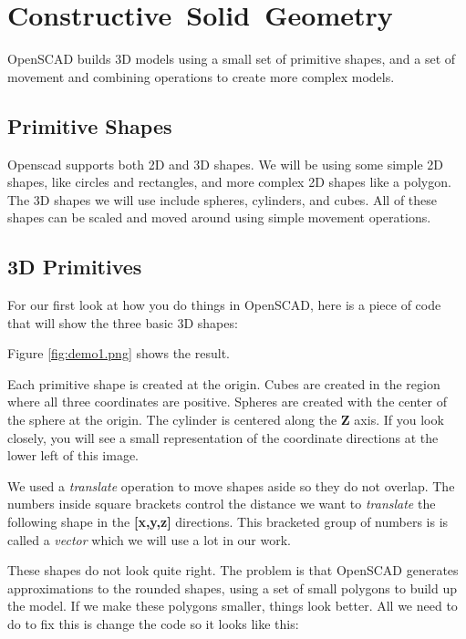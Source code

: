 \section*{\mbox{Constructive Solid Geometry}}

OpenSCAD builds 3D models using a small set of primitive shapes, and a set of
movement and combining operations to create more complex models.

\subsection*{Primitive Shapes}

Openscad supports both 2D and 3D shapes. We will be using some simple 2D
shapes, like circles and rectangles, and more complex 2D shapes like a polygon.
The 3D shapes we will use include spheres, cylinders, and cubes. All of these
shapes can be scaled and moved around using simple movement operations.

\subsection*{3D Primitives}
For our first look at how you do things in OpenSCAD, here is a piece of code
that will show the three basic 3D shapes:


Figure \ref{fig:demo1.png} shows the result.


Each primitive shape is created at the origin. Cubes are created in the region
where all three coordinates are positive. Spheres are created with the center
of the sphere at the origin. The cylinder is centered along the {\bf Z} axis.
If you look closely, you will see a small representation of the coordinate
directions at the lower left of this image.

We used a {\it translate} operation to move shapes aside so they do not
overlap. The numbers inside square brackets control the distance we want to
{\it translate} the following shape in the {\bf [x,y,z]} directions. This
bracketed group of numbers is is called a {\it vector} which we will use a lot
in our work.

These shapes do not look quite right. The problem is that OpenSCAD generates
approximations to the rounded shapes, using a set of small polygons to build up
the model. If we make these polygons smaller, things look better. All we need
to do to fix this is change the code so it looks like this:

